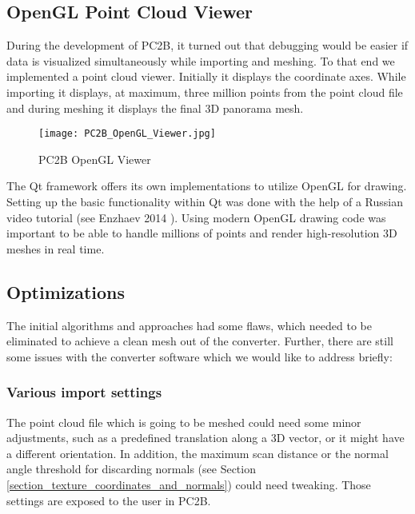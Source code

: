 \pagebreak

\subsection{OpenGL Point Cloud Viewer}

During the development of PC2B, it turned out that debugging would be easier if data is visualized simultaneously while importing and meshing. To that end we implemented a point cloud viewer. Initially it displays the coordinate axes. While importing it displays, at maximum, three million points from the point cloud file and during meshing it displays the final 3D panorama mesh.\\

\begin{figure}[h]
	\centering
	\texttt{[image: PC2B\_OpenGL\_Viewer.jpg]}
	\caption{PC2B OpenGL Viewer}
	\label{fig:pc2b_opengl_viewer}
\end{figure}

The Qt framework offers its own implementations to utilize OpenGL for drawing. Setting up the basic functionality within Qt was done with the help of a Russian video tutorial (see Enzhaev 2014 \parencite{ytQtOpenGL}). Using modern OpenGL drawing code was important to be able to handle millions of points and render high-resolution 3D meshes in real time.


\subsection{Optimizations}
\label{section_optimizations}

The initial algorithms and approaches had some flaws, which needed to be eliminated to achieve a clean mesh out of the converter. Further, there are still some issues with the converter software which we would like to address briefly:

\subsubsection{Various import settings}

The point cloud file which is going to be meshed could need some minor adjustments, such as a predefined translation along a 3D vector, or it might have a different orientation. In addition, the maximum scan distance or the normal angle threshold for discarding normals (see Section \ref{section_texture_coordinates_and_normals}) could need tweaking. Those settings are exposed to the user in PC2B.

